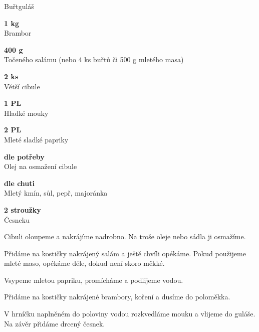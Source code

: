\documentclass[11pt,a4paper]{article}
\begin{document}
\begin{recipe}[Brown]{Buřtguláš}
    \begin{ingredients}
        \item \parbox[t]{\linewidth}{\raggedright \weight \textbf{1 kg}\\ Brambor}
        \item \parbox[t]{\linewidth}{\raggedright \weight \textbf{400 g}\\ Točeného salámu (nebo 4 ks buřtů či 500 g mletého masa)}
        \item \parbox[t]{\linewidth}{\raggedright \piece \textbf{2 ks}\\ Větší cibule}
        \item \parbox[t]{\linewidth}{\raggedright \spoon \textbf{1 PL}\\ Hladké mouky}
        \item \parbox[t]{\linewidth}{\raggedright \spoon \textbf{2 PL}\\ Mleté sladké papriky}
        \item \parbox[t]{\linewidth}{\raggedright \liquid \textbf{dle potřeby}\\ Olej na osmažení cibule}
        \item \parbox[t]{\linewidth}{\raggedright \indefinite \textbf{dle chuti}\\ Mletý kmín, sůl, pepř, majoránka}
        \item \parbox[t]{\linewidth}{\raggedright \piece \textbf{2 stroužky}\\ Česneku}
    \end{ingredients}
    \begin{steps}
        \item Cibuli oloupeme a nakrájíme nadrobno. Na troše oleje nebo sádla ji osmažíme.
        \item Přidáme na kostičky nakrájený salám a ještě chvíli opékáme. Pokud použijeme mleté maso, opékáme déle, dokud není skoro měkké.
        \item Vsypeme mletou papriku, promícháme a podlijeme vodou.
        \item Přidáme na kostičky nakrájené brambory, koření a dusíme do poloměkka.
        \item V hrníčku naplněném do poloviny vodou rozkvedláme mouku a vlijeme do guláše. Na závěr přidáme drcený česnek.
    \end{steps}
\end{recipe}
\end{document}
